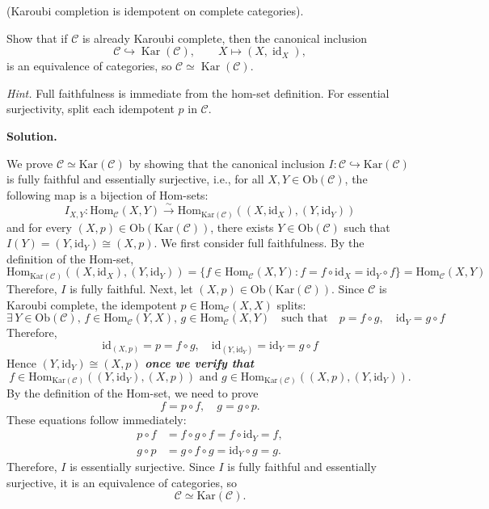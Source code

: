 \documentclass[11pt,a4paper]{article}
\newcounter{problem}
\newcounter{saveequation}
\newenvironment{solution}
{
	\par
	\setcounter{saveequation}{\value{equation}}
	\begingroup
	\setcounter{equation}{0}
	\renewcommand{\theequation}{\arabic{problem}.\arabic{equation}}
	\renewcommand{\theHequation}{sol.\arabic{problem}.\arabic{equation}}
	\noindent\textbf{Solution.}\quad
}
{
	\par
	\endgroup
	\setcounter{equation}{\value{saveequation}}
}
\begin{document}
	\begin{problembox}[14]
		\label{prob.14}
		(Karoubi completion is idempotent on complete categories).
		
		Show that if $\mathcal{C}$ is already Karoubi complete, then the
		canonical inclusion
		\[
		\mathcal{C}\hookrightarrow\operatorname{Kar}(\mathcal{C}),
		\qquad
		X\longmapsto (X,\operatorname{id}_X),
		\]
		is an equivalence of categories, so
		$\mathcal{C}\simeq\operatorname{Kar}(\mathcal{C})$.
		
		\textit{Hint.}
		Full faithfulness is immediate from the hom-set definition.
		For essential surjectivity, split each idempotent $p$ in
		$\mathcal{C}$.
	\end{problembox}
	\begin{solution}
	We prove $\mathcal{C}\simeq \mathrm{Kar}(\mathcal{C})$ by showing that the canonical inclusion $I:\mathcal{C}\hookrightarrow \mathrm{Kar}(\mathcal{C})$ is fully faithful and essentially surjective, i.e., for all $X,Y\in \mathrm{Ob}(\mathcal{C})$, the following map is a bijection of Hom-sets:
	$$
	I_{X,Y}: \mathrm{Hom}_\mathcal{C}(X,Y)\overset{\sim}{\longrightarrow} \mathrm{Hom}_{\mathrm{Kar}(\mathcal{C})}\left((X,\mathrm{id}_X),(Y,\mathrm{id}_Y)\right)
	$$
	and for every $(X,p)\in\mathrm{Ob}(\mathrm{Kar}(\mathcal{C}))$, there exists $Y\in\mathrm{Ob}(\mathcal{C})$ such that $I(Y)=(Y,\mathrm{id}_Y)\cong (X,p)$. We first consider full faithfulness. By the definition of the Hom-set,
	$$
	\mathrm{Hom}_{\mathrm{Kar}(\mathcal{C})}\left((X,\mathrm{id}_X),(Y,\mathrm{id}_Y)\right)=\{f\in \mathrm{Hom}_\mathcal{C}(X,Y):f=f\circ\mathrm{id}_X=\mathrm{id}_Y\circ f\}= \mathrm{Hom}_\mathcal{C}(X,Y)
	$$
	Therefore, $I$ is fully faithful. Next, let $(X,p)\in\mathrm{Ob}(\mathrm{Kar}(\mathcal{C}))$. Since $\mathcal{C}$ is Karoubi complete, the idempotent $p\in\mathrm{Hom}_{\mathcal{C}}(X,X)$ splits:
	$$
	\exists\, Y\in\mathrm{Ob}(\mathcal{C}),\, f\in\mathrm{Hom}_\mathcal{C}(Y,X),\,g\in\mathrm{Hom}_\mathcal{C}(X,Y)\quad\text{such that}\quad p=f\circ g,\quad \mathrm{id}_Y=g\circ f
	$$
	Therefore,
	$$
	\mathrm{id}_{(X,p)}=p=f\circ g,\quad \mathrm{id}_{(Y,\mathrm{id}_Y)}=\mathrm{id}_Y=g\circ f
	$$
	Hence $(Y,\mathrm{id}_Y)\cong (X,p)$ \textbf{\textit{once we verify that}}
	$$
	f\in \mathrm{Hom}_{\mathrm{Kar}(\mathcal{C})}\left((Y,\mathrm{id}_Y),(X,p)\right) \text{~and~} g\in \mathrm{Hom}_{\mathrm{Kar}(\mathcal{C})}\left((X,p),(Y,\mathrm{id}_Y)\right).
	$$
	By the definition of the Hom-set, we need to prove
	$$
	f=p\circ f,\quad g=g\circ p.
	$$
	These equations follow immediately:
	$$
	\begin{aligned}
		p\circ f&=f\circ g \circ f=f\circ\mathrm{id}_Y=f,\\
		g\circ p&=g\circ f\circ g=\mathrm{id}_Y\circ g=g.
	\end{aligned}
	$$
	Therefore, $I$ is essentially surjective. Since $I$ is fully faithful and essentially surjective, it is an equivalence of categories, so
	$$
	\boxed{\mathcal{C}\simeq\mathrm{Kar}(\mathcal{C})}.
	$$
	\end{solution}
\end{document}
